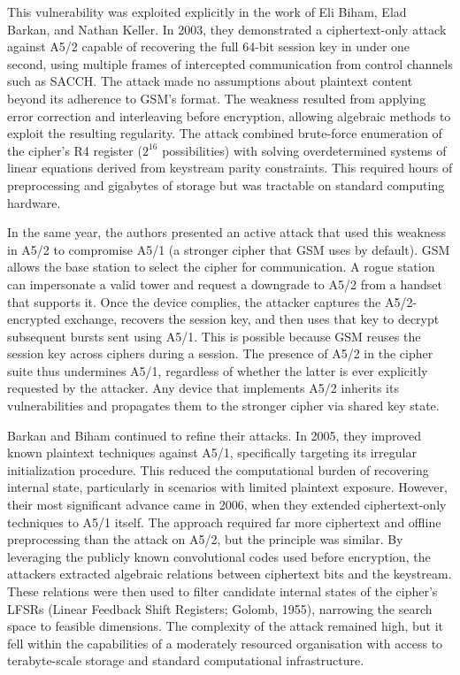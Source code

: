 This vulnerability was exploited explicitly in the work of Eli Biham, Elad Barkan, and Nathan Keller. In 2003, they demonstrated a ciphertext-only attack against A5/2 capable of recovering the full 64-bit session key in under one second, using multiple frames of intercepted communication from control channels such as SACCH. The attack made no assumptions about plaintext content beyond its adherence to GSM’s format. The weakness resulted from applying error correction and interleaving before encryption, allowing algebraic methods to exploit the resulting regularity. The attack combined brute-force enumeration of the cipher's R4 register ($2^{16}$ possibilities) with solving overdetermined systems of linear equations derived from keystream parity constraints. This required hours of preprocessing and gigabytes of storage but was tractable on standard computing hardware.

In the same year, the authors presented an active attack that used this weakness in A5/2 to compromise A5/1 (a stronger cipher that GSM uses by default). GSM allows the base station to select the cipher for communication. A rogue station can impersonate a valid tower and request a downgrade to A5/2 from a handset that supports it. Once the device complies, the attacker captures the A5/2-encrypted exchange, recovers the session key, and then uses that key to decrypt subsequent bursts sent using A5/1. This is possible because GSM reuses the session key across ciphers during a session. The presence of A5/2 in the cipher suite thus undermines A5/1, regardless of whether the latter is ever explicitly requested by the attacker. Any device that implements A5/2 inherits its vulnerabilities and propagates them to the stronger cipher via shared key state.

Barkan and Biham continued to refine their attacks. In 2005, they improved known plaintext techniques against A5/1, specifically targeting its irregular initialization procedure. This reduced the computational burden of recovering internal state, particularly in scenarios with limited plaintext exposure. However, their most significant advance came in 2006, when they extended ciphertext-only techniques to A5/1 itself. The approach required far more ciphertext and offline preprocessing than the attack on A5/2, but the principle was similar. By leveraging the publicly known convolutional codes used before encryption, the attackers extracted algebraic relations between ciphertext bits and the keystream. These relations were then used to filter candidate internal states of the cipher’s LFSRs (Linear Feedback Shift Registers; Golomb, 1955), narrowing the search space to feasible dimensions. The complexity of the attack remained high, but it fell within the capabilities of a moderately resourced organisation with access to terabyte-scale storage and standard computational infrastructure.

